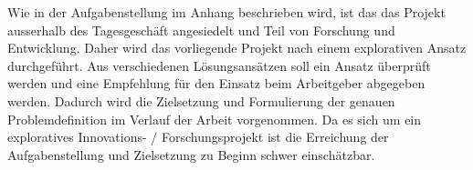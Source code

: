 Wie in der Aufgabenstellung im Anhang  beschrieben wird, ist das das Projekt ausserhalb des
Tagesgeschäft angesiedelt und Teil von Forschung und Entwicklung. Daher wird das vorliegende Projekt nach einem
explorativen Ansatz durchgeführt. Aus verschiedenen Lösungsansätzen soll ein Ansatz überprüft werden und eine Empfehlung
für den Einsatz beim Arbeitgeber abgegeben werden. Dadurch wird die Zielsetzung und Formulierung der genauen
Problemdefinition im Verlauf der Arbeit vorgenommen. Da es sich um ein exploratives Innovations- / Forschungsprojekt
ist die Erreichung der Aufgabenstellung und Zielsetzung zu Beginn schwer einschätzbar.